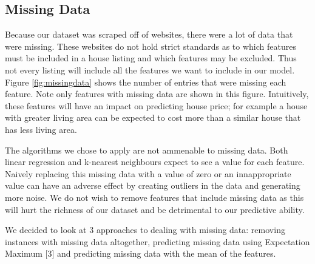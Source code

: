 \documentclass{acm_proc_article-sp}
\begin{document}
\subsection{Missing Data}

	Because our dataset was scraped off of websites, there were a lot of data that were missing. These websites do not hold strict standards as to which features must be included in a house listing and which features may be excluded. Thus not every listing will include all the features we want to include in our model. Figure \ref{fig:missingdata} shows the number of entries that were missing each feature. Note only features with missing data are shown in this figure. Intuitively, these features will have an impact on predicting house price; for example a house with greater living area can be expected to cost more than a similar house that has less living area. 
	
	The algorithms we chose to apply are not ammenable to missing data. Both linear regression and k-nearest neighbours expect to see a value for each feature. Naively replacing this missing data with a value of zero or an innappropriate value can have an adverse effect by creating outliers in the data and generating more noise. We do not wish to remove features that include missing data as this will hurt the richness of our dataset and be detrimental to our predictive ability.
	
	We decided to look at 3 approaches to dealing with missing data: removing instances with missing data altogether, predicting missing data using Expectation Maximum [3] and predicting missing data with the mean of the features. 
	
\end{document}
